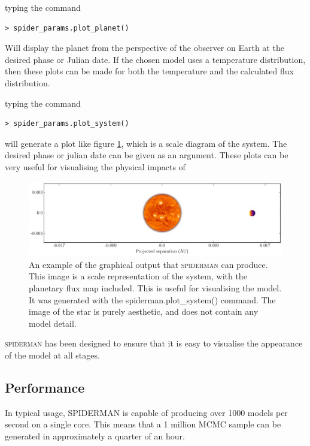 \documentclass[a4paper,fleqn,usenatbib]{mnras}
\begin{document}
typing the command

\begin{Verbatim}[frame=single]
> spider_params.plot_planet()
\end{Verbatim}

Will display the planet from the perspective of the observer on Earth at the desired phase or Julian date. If the chosen model uses a temperature distribution, then these plots can be made for both the temperature and the calculated flux distribution.


typing the command

\begin{Verbatim}[frame=single]
> spider_params.plot_system()
\end{Verbatim}

will generate a plot like figure \ref{fig:plot_system}, which is a scale diagram of the system. The desired phase or julian date can be given as an argument. These plots can be very useful for visualising the physical impacts of

\begin{figure}
\begin{center}
\includegraphics[width=\textwidth]{img/system.pdf}
\caption{An example of the graphical output that \textsc{spiderman} can produce. This image is a scale representation of the system, with the planetary flux map included. This is useful for visualising the model. It was generated with the spiderman.plot\_system() command. The image of the star is purely aesthetic, and does not contain any model detail.}
\label{fig:plot_system}
\end{center}
\end{figure}

\textsc{spiderman} has been designed to ensure that it is easy to visualise the appearance of the model at all stages.

\subsection{Performance}\label{sec:performance}

In typical usage, SPIDERMAN is capable of producing over 1000 models per second on a single core. This means that a 1 million MCMC sample can be generated in approximately a quarter of an hour.
\end{document}
